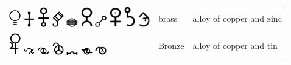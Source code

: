 \documentclass[british,final,landscape]{scrartcl}
\begin{document}
\begin{refsection}
\begin{supertabular}{p{0.3\textwidth}p{0.34\textwidth}p{0.34\textwidth}}
   \includegraphics[width=5mm]{Metals/Brass} \includegraphics[width=5mm]{Metals/Brass2} \includegraphics[width=5mm]{Metals/Brass3} \includegraphics[width=5mm]{Metals/Brass4} \includegraphics[width=5mm]{Metals/Brass5} \includegraphics[width=5mm]{Metals/Brass6} \includegraphics[width=5mm]{Metals/Brass7} \includegraphics[width=5mm]{Metals/Brass8} \includegraphics[width=5mm]{Metals/Brass9} \includegraphics[width=5mm]{Metals/Brass10} & brass & alloy of copper and zinc \\
   \includegraphics[width=5mm]{Metals/Bronze} \includegraphics[width=5mm]{Metals/Bronze2} \includegraphics[width=5mm]{Metals/Bronze3} \includegraphics[width=5mm]{Metals/Bronze4} \includegraphics[width=5mm]{Metals/Bronze5} \includegraphics[width=5mm]{Metals/Bronze6} \includegraphics[width=5mm]{Metals/Bronze7} & Bronze & alloy of copper and tin\\

\end{supertabular}
\end{refsection}
\end{document}
